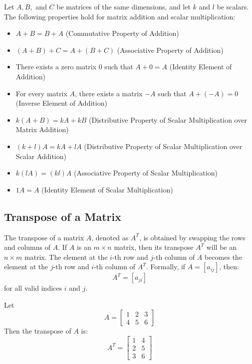 \begin{theorem}
    Let \( A, B, \) and \( C \) be matrices of the same dimensions, and let \( k \) and \( l \) be scalars. The following properties hold for matrix addition and scalar multiplication:
    \begin{itemize}[itemsep=1pt,label=$\circ$]
        \item \( A + B = B + A \) (Commutative Property of Addition)
        \item \( (A + B) + C = A + (B + C) \) (Associative Property of Addition)
        \item There exists a zero matrix \( 0 \) such that \( A + 0 = A \) (Identity Element of Addition)
        \item For every matrix \( A \), there exists a matrix \( -A \) such that \( A + (-A) = 0 \) (Inverse Element of Addition)
        \item \( k(A + B) = kA + kB \) (Distributive Property of Scalar Multiplication over Matrix Addition)
        \item \( (k + l)A = kA + lA \) (Distributive Property of Scalar Multiplication over Scalar Addition)
        \item \( k(lA) = (kl)A \) (Associative Property of Scalar Multiplication)
        \item \( 1A = A \) (Identity Element of Scalar Multiplication)
    \end{itemize}
\end{theorem}

\subsection{Transpose of a Matrix}
\begin{definition}
    The transpose of a matrix \( A \), denoted as \( A^T \), is obtained by swapping the rows and columns of \( A \). If \( A \) is an \( m \times n \) matrix, then its transpose \( A^T \) will be an \( n \times m \) matrix. The element at the \( i \)-th row and \( j \)-th column of \( A \) becomes the element at the \( j \)-th row and \( i \)-th column of \( A^T \). Formally, if \( A = [a_{ij}] \), then:
    \[
        A^T = [a_{ji}]
    \]
    for all valid indices \( i \) and \( j \).
\end{definition}
\begin{eg}
    Let
    \[
        A = \begin{bmatrix}
            1 & 2 & 3 \\
            4 & 5 & 6
        \end{bmatrix}
    \]
    Then the transpose of \( A \) is:
    \[
        A^T = \begin{bmatrix}
            1 & 4 \\
            2 & 5 \\
            3 & 6
        \end{bmatrix}
    \]
\end{eg}

